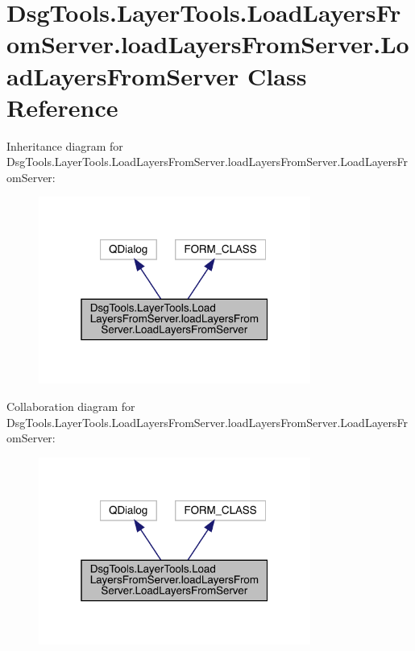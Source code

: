 \hypertarget{class_dsg_tools_1_1_layer_tools_1_1_load_layers_from_server_1_1load_layers_from_server_1_1_load_layers_from_server}{}\section{Dsg\+Tools.\+Layer\+Tools.\+Load\+Layers\+From\+Server.\+load\+Layers\+From\+Server.\+Load\+Layers\+From\+Server Class Reference}
\label{class_dsg_tools_1_1_layer_tools_1_1_load_layers_from_server_1_1load_layers_from_server_1_1_load_layers_from_server}


Inheritance diagram for Dsg\+Tools.\+Layer\+Tools.\+Load\+Layers\+From\+Server.\+load\+Layers\+From\+Server.\+Load\+Layers\+From\+Server\+:
\nopagebreak
\begin{figure}[H]
\begin{center}
\leavevmode
\includegraphics[width=253pt]{class_dsg_tools_1_1_layer_tools_1_1_load_layers_from_server_1_1load_layers_from_server_1_1_load_d8a3f3d5e850a375fdf37b2b7fdf6f54}
\end{center}
\end{figure}


Collaboration diagram for Dsg\+Tools.\+Layer\+Tools.\+Load\+Layers\+From\+Server.\+load\+Layers\+From\+Server.\+Load\+Layers\+From\+Server\+:
\nopagebreak
\begin{figure}[H]
\begin{center}
\leavevmode
\includegraphics[width=253pt]{class_dsg_tools_1_1_layer_tools_1_1_load_layers_from_server_1_1load_layers_from_server_1_1_load_layers_from_server__coll__graph}
\end{center}
\end{figure}
